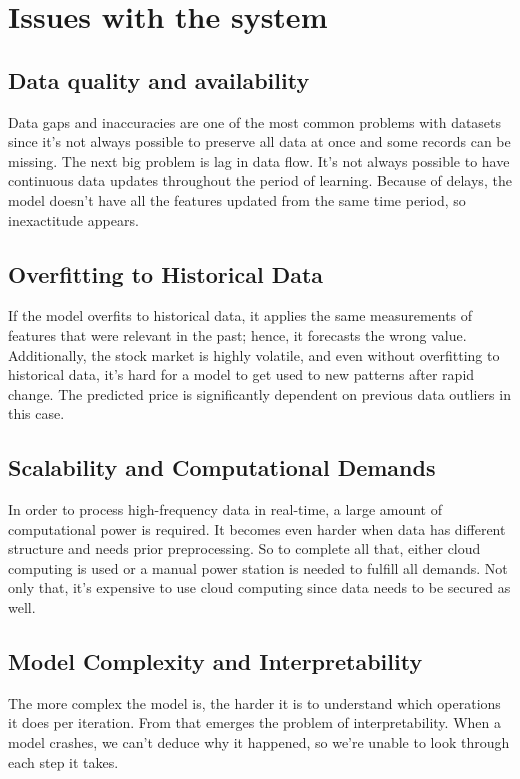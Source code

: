 \documentclass[10pt,twoside,english,a4paper]{article}
\begin{document}
\section{Issues with the system}
\subsection{Data quality and availability}
Data gaps and inaccuracies are one of the most common problems with datasets since it's not always possible to preserve all data at once and some records can be missing. The next big problem is lag in data flow. It's not always possible to have continuous data updates throughout the period of learning. Because of delays, the model doesn't have all the features updated from the same time period, so inexactitude appears.\cite{quality}
\subsection{Overfitting to Historical Data}
If the model overfits to historical data, it applies the same measurements of features that were relevant in the past; hence, it forecasts the wrong value. Additionally, the stock market is highly volatile, and even without overfitting to historical data, it's hard for a model to get used to new patterns after rapid change. The predicted price is significantly dependent on previous data outliers in this case.\cite{overfit}
\subsection{Scalability and Computational Demands}
In order to process high-frequency data in real-time, a large amount of computational power is required. It becomes even harder when data has different structure and needs prior preprocessing. So to complete all that, either cloud computing is used or a manual power station is needed to fulfill all demands. Not only that, it's expensive to use cloud computing since data needs to be secured as well.\cite{scalability}
\subsection{Model Complexity and Interpretability}
The more complex the model is, the harder it is to understand which operations it does per iteration. From that emerges the problem of interpretability. When a model crashes, we can't deduce why it happened, so we're unable to look through each step it takes. \cite{complexity}
 
\end{document}
